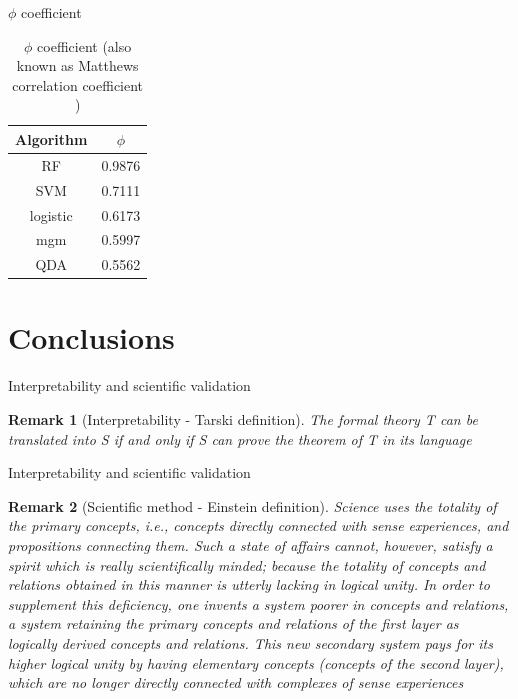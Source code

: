 \documentclass{beamer}
\newtheorem*{remark}{Remark}
\begin{document}
\begin{frame}{$\phi$ coefficient}
\begin{table}[]
\caption{$\phi$ coefficient (also known as Matthews correlation coefficient )}
\begin{center}
\begin{tabular}{c|c}
Algorithm & $\phi$ \\ \hline
RF        & 0.9876 \\ \hline
SVM       & 0.7111 \\ \hline
logistic  & 0.6173 \\ \hline
mgm       & 0.5997 \\ \hline
QDA       & 0.5562 
\end{tabular}
\end{center}
\label{phi_values}
\end{table}
\end{frame}

\section{Conclusions}

\begin{frame}{Interpretability and scientific validation}

\begin{remark}[Interpretability - Tarski definition]
The formal theory T can be translated into S if and only if S can prove the theorem of T in its language \cite{tarski1953undecidable}
\end{remark}

\end{frame}

\begin{frame}{Interpretability and scientific validation}

\begin{remark}[Scientific method - Einstein definition]
Science uses the totality of the primary concepts, i.e., concepts directly connected with sense experiences, and propositions connecting them. Such a state of affairs cannot, however, satisfy a spirit which is really scientifically minded; because the totality of concepts and relations obtained in this manner is utterly lacking in logical unity. In order to supplement this deficiency, one invents a system poorer in concepts and relations, a system retaining the primary concepts and relations of the \textit{first layer} as logically derived concepts and relations. This new \textit{secondary system} pays for its higher logical unity by having elementary concepts (concepts of the second layer), which are no longer directly connected with complexes of sense experiences \cite{physics-reality}
\end{remark}

\end{frame}
\end{document}
